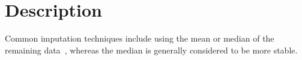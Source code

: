 \section{Description}\label{s:description}


Common imputation techniques include using the mean or median of the remaining data~\cite{Zhang2016-ak}, whereas the median is generally considered to be more stable.